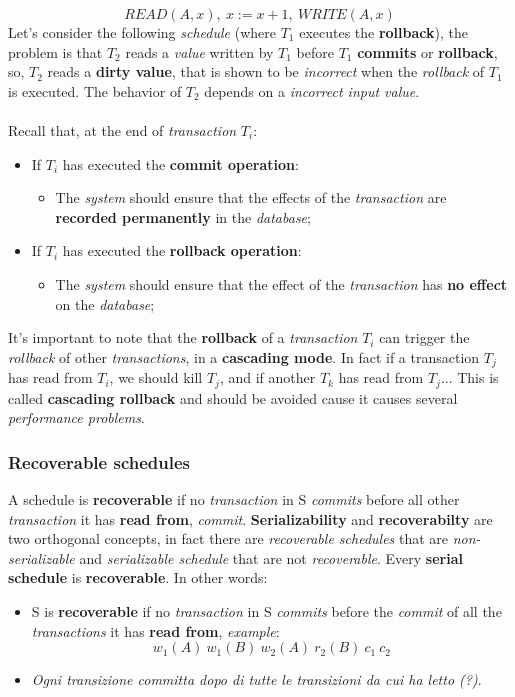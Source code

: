 \documentclass{article}
\begin{document}
% 
\[READ(A,x) ,\ x := x + 1 ,\ WRITE(A,x)\]
Let's consider the following \emph{schedule} (where $T_1$ executes the \textbf{rollback}), the problem is that $T_2$ reads a \emph{value} written by $T_1$ before $T_1$ \textbf{commits} or \textbf{rollback}, so, $T_2$ reads a \textbf{dirty value}, that is shown to be \emph{incorrect} when the \emph{rollback} of $T_1$ is executed. The behavior of $T_2$ depends on a \emph{incorrect input value}.%
\\\\Recall that, at the end of \emph{transaction} $T_i$:
\begin{itemize}
\item If $T_i$ has executed the \textbf{commit operation}:
\begin{itemize}
\item The \emph{system} should ensure that the effects of the \emph{transaction} are \textbf{recorded permanently} in the \emph{database};
\end{itemize}
\item If $T_i$ has executed the \textbf{rollback operation}:
\begin{itemize}
\item The \emph{system} should ensure that the effect of the \emph{transaction} has \textbf{no effect} on the \emph{database};
\end{itemize}
\end{itemize}
\clearpage
It's important to note that the \textbf{rollback} of a \emph{transaction} $T_i$ can trigger the \emph{rollback} of other \emph{transactions}, in a \textbf{cascading mode}. In fact if a transaction $T_j$ has read from $T_i$, we should kill $T_j$, and if another $T_k$ has read from $T_j$...	This is called \textbf{cascading rollback} and should be avoided cause it causes several \emph{performance problems}. 
\subsubsection{Recoverable schedules}
A schedule is \textbf{recoverable} if no \emph{transaction} in S \emph{commits} before all other \emph{transaction} it has \textbf{read from}, \emph{commit}. \textbf{Serializability} and \textbf{recoverabilty} are two orthogonal concepts, in fact there are \emph{recoverable schedules} that are \emph{non-serializable} and \emph{serializable schedule} that are not \emph{recoverable}. Every \textbf{serial schedule} is \textbf{recoverable}. In other words:
\begin{itemize}
\item S is \textbf{recoverable} if no \emph{transaction} in S \emph{commits} before the \emph{commit} of all the \emph{transactions} it has\textbf{ read from}, \emph{example}:
\[w_1(A)\ w_1(B)\ w_2(A)\ r_2(B)\ c_1\ c_2\]
\item \emph{Ogni transizione committa dopo di tutte le transizioni da cui ha letto (?)}.
\end{itemize}
\end{document}
